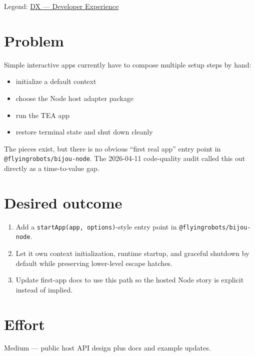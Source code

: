 Legend: \href{https://github.com/flyingrobots/bijou/blob/1853ad902f6bf219326409e7f743a5a1d6517dbc/docs/method/legends/DX-developer-experience.md}{DX --- Developer Experience}

\section{Problem}\label{record-326-problem}

Simple interactive apps currently have to compose multiple setup steps by hand:

\begin{itemize}
\tightlist
\item
  initialize a default context
\item
  choose the Node host adapter package
\item
  run the TEA app
\item
  restore terminal state and shut down cleanly
\end{itemize}

The pieces exist, but there is no obvious ``first real app'' entry point in \texttt{@\allowbreak{}f\allowbreak{}l\allowbreak{}y\allowbreak{}i\allowbreak{}n\allowbreak{}g\allowbreak{}r\allowbreak{}o\allowbreak{}b\allowbreak{}o\allowbreak{}t\allowbreak{}s\allowbreak{}/\allowbreak{}b\allowbreak{}i\allowbreak{}j\allowbreak{}o\allowbreak{}u\allowbreak{}-\allowbreak{}n\allowbreak{}o\allowbreak{}d\allowbreak{}e}. The 2026-04-11 code-quality audit called this out directly as a time-to-value gap.

\section{Desired outcome}\label{record-326-desired-outcome}

\begin{enumerate}
\def\labelenumi{\arabic{enumi}.}
\tightlist
\item
  Add a \texttt{s\allowbreak{}t\allowbreak{}a\allowbreak{}r\allowbreak{}t\allowbreak{}A\allowbreak{}p\allowbreak{}p\allowbreak{}(\allowbreak{}a\allowbreak{}p\allowbreak{}p\allowbreak{},\allowbreak{} \allowbreak{}o\allowbreak{}p\allowbreak{}t\allowbreak{}i\allowbreak{}o\allowbreak{}n\allowbreak{}s\allowbreak{})}-style entry point in \texttt{@\allowbreak{}f\allowbreak{}l\allowbreak{}y\allowbreak{}i\allowbreak{}n\allowbreak{}g\allowbreak{}r\allowbreak{}o\allowbreak{}b\allowbreak{}o\allowbreak{}t\allowbreak{}s\allowbreak{}/\allowbreak{}b\allowbreak{}i\allowbreak{}j\allowbreak{}o\allowbreak{}u\allowbreak{}-\allowbreak{}n\allowbreak{}o\allowbreak{}d\allowbreak{}e}.
\item
  Let it own context initialization, runtime startup, and graceful shutdown by default while preserving lower-level escape hatches.
\item
  Update first-app docs to use this path so the hosted Node story is explicit instead of implied.
\end{enumerate}

\section{Effort}\label{record-326-effort}

Medium --- public host API design plus docs and example updates.

